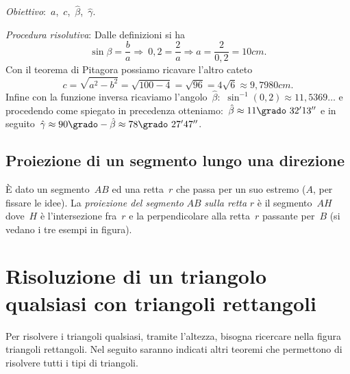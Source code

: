 \begin{exrig}
\begin{esempio}
\emph{Obiettivo}:~$a$,\quad~$c$,\quad~${\hat{\beta}}$,\quad~${\hat{\gamma}}$.

\emph{Procedura risolutiva}:
Dalle definizioni si ha
\[\sin \beta=\frac{b}{a} \Rightarrow~0,2=\frac{2}{a}\Rightarrow 
a=\frac{2}{0,2}=10\unit{cm}.\]
Con il teorema di Pitagora possiamo ricavare l'altro cateto
\[c=\sqrt{a^{2}-b^{2}}=\sqrt{100-4}=\sqrt{96}=4\sqrt{6}\approx9,7980\unit{cm}.\]
Infine con la funzione inversa ricaviamo 
l'angolo~${\hat{\beta}}$:~$\sin^{-1}(0,2)\approx11,5369\ldots$ e procedendo come 
spiegato in
precedenza otteniamo:~${\hat{\beta}}\approx11\grado~32' 13''$ e in 
seguito~${\hat{\gamma}}\approx90\grado-{\hat{\beta}}\approx78\grado~27'47''$.
 \end{esempio}
\end{exrig}


\subsection{Proiezione di un segmento lungo una direzione}

È dato un segmento~$AB$ ed una retta~$r$ che passa per un suo estremo ($A$, per 
fissare le idee). La
\emph{proiezione del segmento} $AB$ \emph{sulla retta} $r$ è il segmento~$AH$ 
dove~$H$ è l'intersezione fra~$r$ e la
perpendicolare alla retta~$r$ passante per~$B$ (si vedano i tre esempi in 
figura).
\begin{inaccessibleblock}
\begin{center}
 
\end{center}
\end{inaccessibleblock}


\section{Risoluzione di un triangolo qualsiasi con triangoli rettangoli}
\label{sec:trigo_altritriangoli}

Per risolvere i triangoli qualsiasi, tramite l'altezza, bisogna ricercare nella 
figura triangoli rettangoli.
Nel seguito saranno indicati altri teoremi che permettono
di risolvere tutti i tipi di triangoli.

